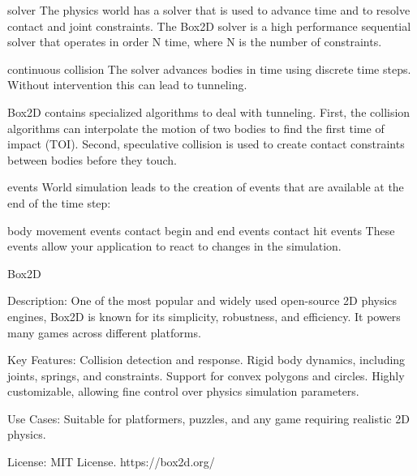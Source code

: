 \documentclass{projdoc}
\begin{document}
solver
The physics world has a solver that is used to advance time and to resolve contact and joint constraints. The Box2D solver is a high performance sequential solver that operates in order N time, where N is the number of constraints.

continuous collision
The solver advances bodies in time using discrete time steps. Without intervention this can lead to tunneling.

Box2D contains specialized algorithms to deal with tunneling. First, the collision algorithms can interpolate the motion of two bodies to find the first time of impact (TOI). Second, speculative collision is used to create contact constraints between bodies before they touch.

events
World simulation leads to the creation of events that are available at the end of the time step:

body movement events
contact begin and end events
contact hit events
These events allow your application to react to changes in the simulation.



Box2D

Description: One of the most popular and widely used open-source 2D physics engines, Box2D is known for its simplicity, robustness, and efficiency. It powers many games across different platforms.

Key Features:
Collision detection and response.
Rigid body dynamics, including joints, springs, and constraints.
Support for convex polygons and circles.
Highly customizable, allowing fine control over physics simulation parameters.

Use Cases: Suitable for platformers, puzzles, and any game requiring realistic 2D physics.

License: MIT License.
https://box2d.org/
\end{document}
